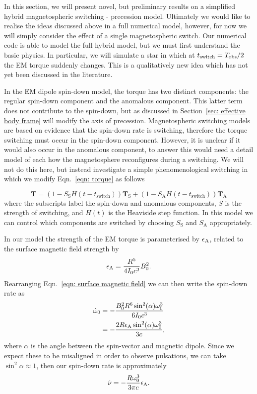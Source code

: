 \documentclass[../full_thesis/full_thesis.tex]{subfiles}
\begin{document}
In this section, we will present novel, but preliminary results on a simplified
hybrid magnetospheric switching - precession model. Ultimately we would like to
realise the ideas discussed above in a full numerical model, however, for now
we will simply consider the effect of a single magnetospheric switch. Our numerical
code is able to model the full hybrid model, but we must first understand the
basic physics. In particular, we will simulate a star in which at
$t_{\mathrm{switch}} = T_{\textrm{obs}}/2$ the EM torque suddenly changes. This is a qualitatively
new idea which has not yet been discussed in the literature.

In the EM dipole spin-down model, the torque has two distinct components: the
regular spin-down component and the anomalous component. This latter term
does not contribute to the spin-down, but as discussed in Section~\ref{sec: effective
body frame} will modify the axis of precession. Magnetospheric switching models
are based on evidence that the spin-down rate is switching, therefore the torque
switching must occur in the spin-down component. However, it is unclear if it would
also occur in the anomalous component, to answer this would need a detail model
of each how the magnetosphere reconfigures during a switching. We will not do
this here, but instead investigate a simple phenomenological switching in which we
modify Eqn.~\eqref{eqn: torque} as follows
\newcommand{\Ss}{S_{\mathrm{S}}}
\newcommand{\Sa}{S_{\mathrm{A}}}

\begin{equation}
\mathbf{T} = (1 - \Ss H(t-t_{\mathrm{switch}})) \mathbf{T}_{\mathrm{S}}+
                 (1 - \Sa H(t-t_{\mathrm{switch}})) \mathbf{T}_{\mathrm{A}}
\label{eqn: single switch torque}
\end{equation}
where the subscripts label the spin-down and anomalous components, $S$ is the
strength of switching, and $H(t)$ is the Heaviside step function. In this model
we can control which components are switched by choosing $\Ss$ and $\Sa$
appropriately.

In our model the strength of the EM torque is parameterised
by $\epsilon_{\mathrm{A}}$, related to the surface magnetic field strength by
\begin{align}
    \epsilon_{\mathrm{A}} = \frac{R^{5}}{4I_{0} c^{2}} B_{0}^{2}.
\end{align}
Rearranging Eqn.~\eqref{eqn: surface magnetic field} we can then write the
spin-down rate as
\begin{align}
    \dot{\omega}_{0} & = -\frac{B_{0}^{2}R^{6} \sin^{2}(\alpha) \omega_{0}^{3}}{6 I_{0} c^{3}} \\
    & = - \frac{2 R \epsilon_{\mathrm{A}} \sin^{2}(\alpha) \omega_{0}^{3}}{3 c},
\end{align}
where $\alpha$ is the angle between the spin-vector and magnetic dipole. Since
we expect these to be misaligned in order to observe pulsations, we can take
$\sin^{2}\alpha \approx 1$, then our spin-down rate is approximately
\begin{equation}
    \dot{\nu} = - \frac{R\omega_{0}^{3}}{3\pi c}\epsilon_{\mathrm{A}}.
    \label{eqn: spin-down of epsA}
\end{equation}
\end{document}
